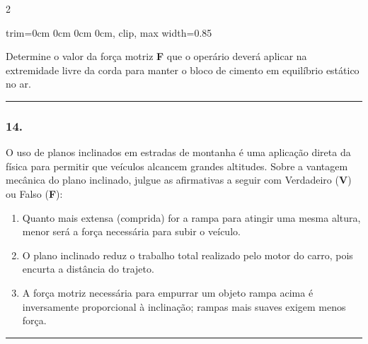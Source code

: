 \documentclass[twoside, 10pt, a4paper]{article}
\newlength{\espacoPreQuestao}\setlength{\espacoPreQuestao}{0.1cm}
\newlength{\espacoQuestao}\setlength{\espacoQuestao}{0.2cm}
\newlength{\espacoAlt}\setlength{\espacoAlt}{0.2cm}
\newcommand{\larguraTikz}{0.85\linewidth}
\begin{document}
\begin{multicols*}{2}
\begin{center}
\begin{adjustbox}{trim=0cm 0cm 0cm 0cm, clip, max width=\larguraTikz}
\end{adjustbox}
\end{center}
Determine o valor da força motriz \textbf{F} que o operário deverá aplicar na extremidade livre da corda para manter o bloco de cimento em equilíbrio estático no ar.
\par\vspace{\espacoQuestao}

\noindent\textcolor{CorLinha}{\rule{\linewidth}{0.5pt}} 
\par\vspace{\espacoPreQuestao}
\subsubsection*{14.} O uso de planos inclinados em estradas de montanha é uma aplicação direta da física para permitir que veículos alcancem grandes altitudes. Sobre a vantagem mecânica do plano inclinado, julgue as afirmativas a seguir com Verdadeiro (\textbf{V}) ou Falso (\textbf{F}):
\begin{enumerate}[label=\Roman*., itemsep=\espacoAlt]
    \item Quanto mais extensa (comprida) for a rampa para atingir uma mesma altura, menor será a força necessária para subir o veículo.
    \item O plano inclinado reduz o trabalho total realizado pelo motor do carro, pois encurta a distância do trajeto.
    \item A força motriz necessária para empurrar um objeto rampa acima é inversamente proporcional à inclinação; rampas mais suaves exigem menos força.
\end{enumerate}
\par\vspace{\espacoQuestao}

\noindent\textcolor{CorLinha}{\rule{\linewidth}{0.5pt}} 
\par\vspace{\espacoPreQuestao}

\end{multicols*}
\end{document}
